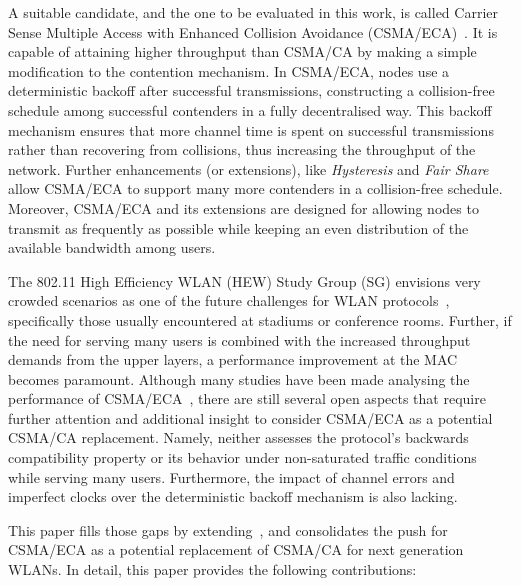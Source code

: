 \documentclass[a4paper,journal]{IEEEtran}
\begin{document}
A suitable candidate, and the one to be evaluated in this work, is called Carrier Sense Multiple Access with Enhanced Collision Avoidance (CSMA/ECA)~\cite{barcelo2008lba}. It is capable of attaining higher throughput than CSMA/CA by making a simple modification to the contention mechanism. In CSMA/ECA, nodes use a deterministic backoff after successful transmissions, constructing a collision-free schedule among successful contenders in a fully decentralised way. This backoff mechanism ensures that more channel time is spent on successful transmissions rather than recovering from collisions, thus increasing the throughput of the network. Further enhancements (or extensions), like \emph{Hysteresis} and \emph{Fair Share}~\cite{research2standards} allow CSMA/ECA to support many more contenders in a collision-free schedule. Moreover, CSMA/ECA and its extensions are designed for allowing nodes to transmit as frequently as possible while keeping an even distribution of the available bandwidth among users.

The 802.11 High Efficiency WLAN (HEW) Study Group (SG) envisions very crowded scenarios as one of the future challenges for WLAN protocols~\cite{HEW-scenarios}, specifically those usually encountered at stadiums or conference rooms. Further, if the need for serving many users is combined with the increased throughput demands from the upper layers, a performance improvement at the MAC becomes paramount. Although many studies have been made analysing the performance of CSMA/ECA~\cite{barcelo2008lba,research2standards,bellalta2009vtc,E2CA_performance}, there are still several open aspects that require further attention and additional insight to consider CSMA/ECA as a potential CSMA/CA replacement. Namely, neither assesses the protocol's backwards compatibility property or its behavior under non-saturated traffic conditions while serving many users. Furthermore, the impact of channel errors and imperfect clocks over the deterministic backoff mechanism is also lacking.

This paper fills those gaps by extending~\cite{research2standards}, and consolidates the push for CSMA/ECA as a potential replacement of CSMA/CA for next generation WLANs. In detail, this paper provides the following contributions:
\end{document}
